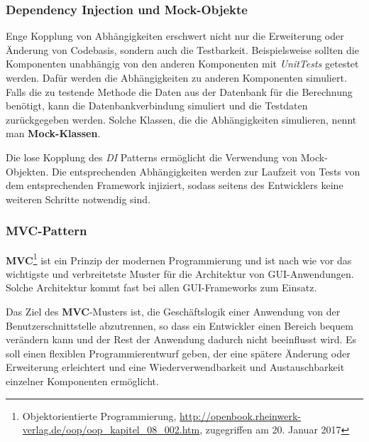 \subsubsection{Dependency Injection und Mock-Objekte}

Enge Kopplung von Abhängigkeiten erschwert nicht nur die Erweiterung oder Änderung von Codebasis, sondern auch die Testbarkeit. Beispielsweise sollten die Komponenten unabhängig von den anderen Komponenten mit \textit{UnitTests} getestet werden. Dafür werden die Abhängigkeiten zu anderen Komponenten simuliert. Falls die zu testende Methode die Daten aus der Datenbank für die Berechnung benötigt, kann die Datenbankverbindung simuliert und die Testdaten zurückgegeben werden. Solche Klassen, die die Abhängigkeiten simulieren, nennt man \textbf{Mock-Klassen}.

Die lose Kopplung des \textit{DI} Patterns ermöglicht die Verwendung von Mock-Objekten. Die entsprechenden Abhängigkeiten werden zur Laufzeit von Tests von dem entsprechenden Framework injiziert, sodass seitens des Entwicklers keine weiteren Schritte notwendig sind.

\subsubsection{MVC-Pattern}\label{mvc}

\textbf{MVC}\footnote{Objektorientierte Programmierung, \url{http://openbook.rheinwerk-verlag.de/oop/oop_kapitel_08_002.htm}, zugegriffen am 20. Januar 2017} ist ein Prinzip der modernen Programmierung und ist nach wie vor das wichtigste und verbreitetste Muster für die Architektur von GUI-Anwendungen. Solche Architektur kommt fast bei allen GUI-Frameworks zum Einsatz.

Das Ziel des \textbf{MVC}-Musters ist, die Geschäftslogik einer Anwendung von der Benutzerschnittstelle abzutrennen, so dass ein Entwickler einen Bereich bequem verändern kann und der Rest der Anwendung dadurch nicht beeinflusst wird. Es soll einen flexiblen Programmierentwurf geben, der eine spätere Änderung oder Erweiterung erleichtert und eine Wiederverwendbarkeit und Austauschbarkeit einzelner Komponenten ermöglicht.

